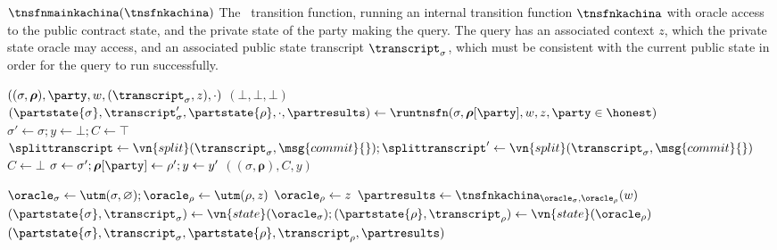 \begin{transitionfn}{$\tnsfnmainkachina(\tnsfnkachina)$}
  The \kachina\ transition function, running an internal transition
  function $\tnsfnkachina$ with oracle access to the public contract state, and the
  private state of the party making the query. The query has an associated
  context $z$, which the private state oracle may access, and an associated
  public state transcript $\transcript_\sigma$, which must be consistent with
  the current public state in order for the query to run successfully.

  \vsep
  
  \begin{receiveinput*}{$((\sigma, \boldsymbol\rho), \party, w,
      (\transcript_\sigma, z), \cdot)$}
    \If{$\transcript_\sigma(\sigma) = \bot$}
      \Return $(\bot, \bot, \bot)$
    \EndIf
    \State \Let $(\partstate{\sigma}, \transcript_\sigma', \partstate{\rho}, \cdot, \partresults) \gets
      \runtnsfn(\sigma, \boldsymbol\rho[\party], w, z, \party \in \honest)$
    \State \Let $\sigma' \gets \sigma; y \gets \bot; C \gets \top$
    \State \Let $\splittranscript \gets
      \vn{split}(\transcript_\sigma, \msg{commit}{}); \splittranscript' \gets
      \vn{split}(\transcript_\sigma, \msg{commit}{})$
        \State \Let $C \gets \bot$
        \State \Break
      \EndIf
      \State \Let $\sigma \gets \sigma'; \boldsymbol\rho[\party] \gets \rho'; y
        \gets y'$
    \EndFor
    \State \Return $((\sigma, \boldsymbol\rho), C, y)$
  \end{receiveinput*}

  \begin{helpers}
      \State $\oracle_\sigma \gets \utm(\sigma, \varnothing); \oracle_\rho \gets
        \utm(\rho, z)$
        \Let $\oracle_\rho \gets z$
      \EndIf
      \State $\partresults \gets \tnsfnkachina_{\oracle_\sigma,\oracle_\rho}(w)$
      \State $(\partstate{\sigma}, \transcript_\sigma) \gets \vn{state}(\oracle_\sigma);
      (\partstate{\rho}, \transcript_\rho) \gets \vn{state}(\oracle_\rho)$
      \State \Return $(\partstate{\sigma}, \transcript_\sigma, \partstate{\rho}, \transcript_\rho, \partresults)$
    \EndFunction
  \end{helpers}
\end{transitionfn}
